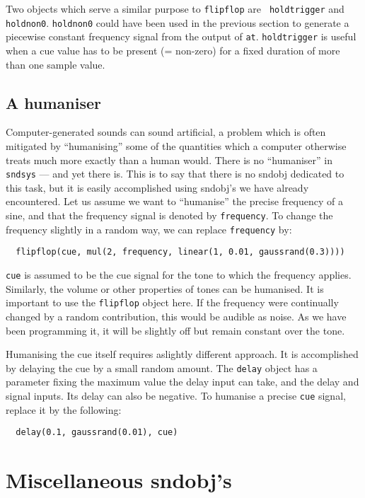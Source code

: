 \documentclass{article}
\def\bv{\begin{verbatim}}
\begin{document}
Two objects which serve a similar purpose to {\tt flipflop} are {\tt
holdtrigger} and {\tt holdnon0}.  {\tt holdnon0} could have been used in the
previous section to generate a piecewise constant frequency signal from the
output of {\tt at}.  {\tt holdtrigger} is useful when a cue value has to be
present (= non-zero) for a fixed duration of more than one sample value.


\subsection{A humaniser}

Computer-generated sounds can sound artificial, a problem which is often
mitigated by ``humanising'' some of the quantities which a computer otherwise
treats much more exactly than a human would.  There is no ``humaniser'' in {\tt
sndsys} --- and yet there is.  This is to say that there is no sndobj dedicated
to this task, but it is easily accomplished using sndobj's we have already
encountered.  Let us assume we want to ``humanise'' the precise frequency of a
sine, and that the frequency signal is denoted by {\tt frequency}.  To change
the frequency slightly in a random way, we can replace {\tt frequency} by:

\bv
  flipflop(cue, mul(2, frequency, linear(1, 0.01, gaussrand(0.3))))
\end{verbatim}

{\tt cue} is assumed to be the cue signal for the tone to which the frequency
applies.  Similarly, the volume or other properties of tones can be humanised.
It is important to use the {\tt flipflop} object here.  If the frequency were
continually changed by a random contribution, this would be audible as noise.
As we have been programming it, it will be slightly off but remain constant
over the tone.

Humanising the cue itself requires aslightly different approach.  It is
accomplished by delaying the cue by a small random amount.  The {\tt delay}
object has a parameter fixing the maximum value the delay input can take, and
the delay and signal inputs.  Its delay can also be negative.  To humanise a
precise {\tt cue} signal, replace it by the following:

\bv
  delay(0.1, gaussrand(0.01), cue)
\end{verbatim}



\section{Miscellaneous sndobj's}
\end{document}
